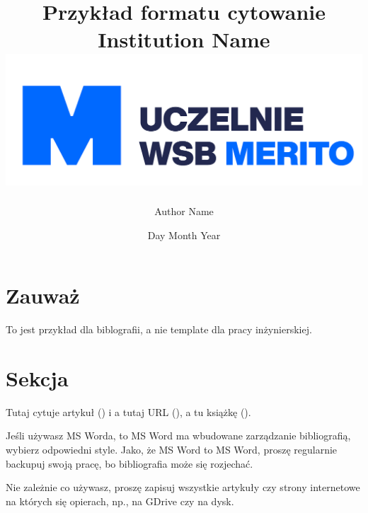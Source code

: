 \documentclass[12pt,a4paper]{report}
\title{
{Przykład formatu cytowanie}\\
{\large Institution Name}\\
{\includegraphics[width=\textwidth]{logomerito.png}}
}
\author{Author Name}
\date{Day Month Year}
\begin{document}
\maketitle

\section*{Zauważ}

To jest przykład dla biblografii, a nie template dla pracy inżynierskiej.

\section*{Sekcja}

Tutaj cytuje artykuł (\cite{knuth:1984}) i a tutaj URL (\cite{immigrants2021a}), a tu książkę (\cite{texbook}).

Jeśli używasz MS Worda, to MS Word ma wbudowane zarządzanie bibliografią, wybierz odpowiedni style. Jako, że MS Word to MS Word, proszę regularnie backupuj swoją pracę, bo bibliografia może się rozjechać.

Nie zależnie co używasz, proszę zapisuj wszystkie artykuły czy strony internetowe na których się opierach, np., na GDrive czy na dysk.


\end{document}
